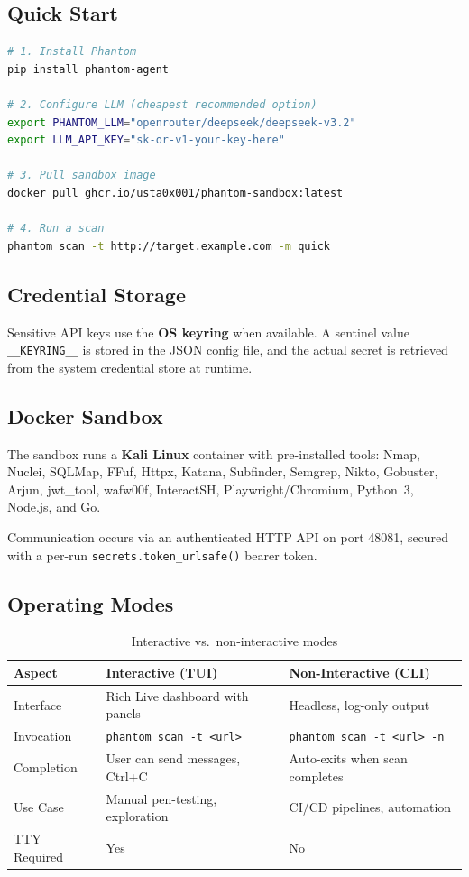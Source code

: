 \documentclass[11pt,a4paper]{article}
\begin{document}
\subsection{Quick Start}
\begin{lstlisting}[language=bash,caption={Minimal setup to run Phantom}]
# 1. Install Phantom
pip install phantom-agent

# 2. Configure LLM (cheapest recommended option)
export PHANTOM_LLM="openrouter/deepseek/deepseek-v3.2"
export LLM_API_KEY="sk-or-v1-your-key-here"

# 3. Pull sandbox image
docker pull ghcr.io/usta0x001/phantom-sandbox:latest

# 4. Run a scan
phantom scan -t http://target.example.com -m quick
\end{lstlisting}

\subsection{Credential Storage}
Sensitive API keys use the \textbf{OS keyring} when available. A sentinel value
\texttt{\_\_KEYRING\_\_} is stored in the JSON config file, and the actual secret
is retrieved from the system credential store at runtime.

\subsection{Docker Sandbox}
The sandbox runs a \textbf{Kali Linux} container with pre-installed tools:
Nmap, Nuclei, SQLMap, FFuf, Httpx, Katana, Subfinder, Semgrep, Nikto,
Gobuster, Arjun, jwt\_tool, wafw00f, InteractSH, Playwright/Chromium,
Python~3, Node.js, and Go.

Communication occurs via an authenticated HTTP API on port 48081, secured
with a per-run \texttt{secrets.token\_urlsafe()} bearer token.

\subsection{Operating Modes}
\begin{table}[H]
\centering
\caption{Interactive vs.\ non-interactive modes}
\label{tab:modes}
\begin{tabularx}{\textwidth}{lXX}
\toprule
\textbf{Aspect} & \textbf{Interactive (TUI)} & \textbf{Non-Interactive (CLI)} \\
\midrule
Interface    & Rich Live dashboard with panels & Headless, log-only output \\
Invocation   & \texttt{phantom scan -t <url>} & \texttt{phantom scan -t <url> -n} \\
Completion   & User can send messages, Ctrl+C & Auto-exits when scan completes \\
Use Case     & Manual pen-testing, exploration & CI/CD pipelines, automation \\
TTY Required & Yes & No \\
\bottomrule
\end{tabularx}
\end{table}
\end{document}
